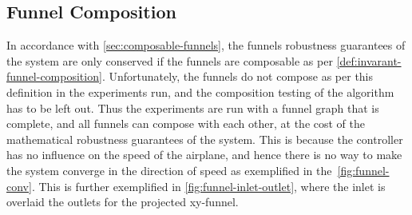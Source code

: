 \subsection{Funnel Composition}
\label{subsec:funnel-no-composable}

In accordance with \cref{sec:composable-funnels}, the funnels robustness
guarantees of the system are only conserved if the funnels are composable as per
\cref{def:invarant-funnel-composition}. Unfortunately, the funnels do not
compose as per this definition in the experiments run, and the composition
testing of the algorithm has to be left out. Thus the experiments are run with a
funnel graph that is complete, and all funnels can compose with each other, at
the cost of the mathematical robustness guarantees of the system. This is
because the controller has no influence on the speed of the airplane, and hence
there is no way to make the system converge in the direction of speed as
exemplified in the~\cref{fig:funnel-conv}. This is further exemplified in
\cref{fig:funnel-inlet-outlet}, where the inlet is overlaid the outlets for the
projected xy-funnel.

